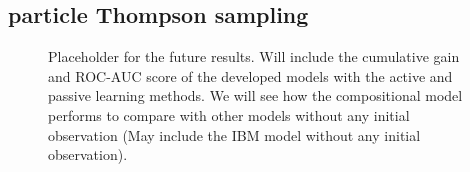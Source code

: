 \subsection{particle Thompson sampling}
\begin{figure}[t]
	\centering
	
	\caption{Placeholder for the future results. Will include the cumulative gain and ROC-AUC score of the developed models with the active and passive learning methods. We will see how the compositional model performs to compare with other models without any initial observation (May include the IBM model without any initial observation).}
\end{figure}

